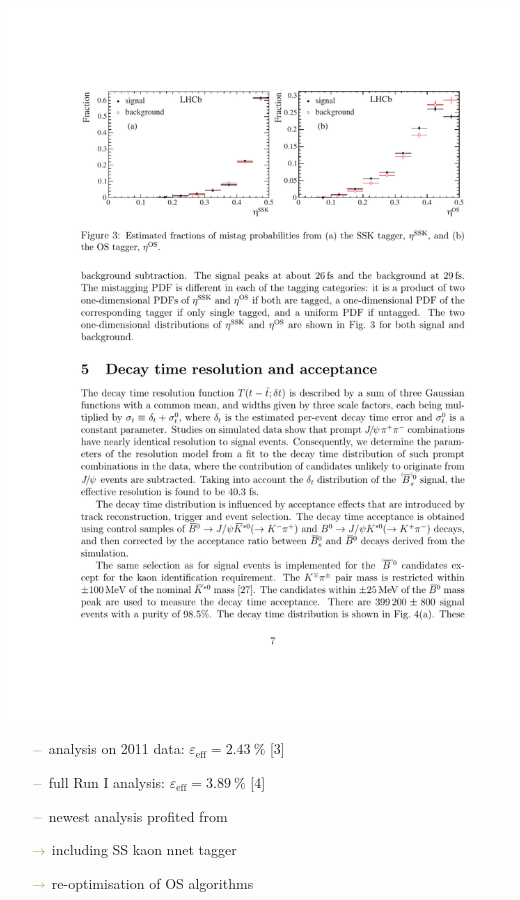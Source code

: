 {\begin{minipage}{0.474\boxwidth}
\begin{itemize}
\vspace{-1.7em}
\begin{center}
\includegraphics[width=0.315\boxwidth]{figures/Jpsipipi_SSK.pdf}
\end{center}
\vspace{-2.7em}

	\begin{itemize}
	\setlength\itemsep{0.01em}
	\setlength{\itemindent}{-.11in}
	\item[${\color{tu_gruen}-}$] analysis on \num{2011} data: $\varepsilon_\text{eff}=\SI{2.43}{\%}$ [3] 
	\item[${\color{tu_gruen}-}$] full Run I analysis: $\varepsilon_\text{eff}=\SI{3.89}{\%}$ [4] 
	\item[${\color{tu_gruen}-}$] newest analysis profited from 
	\setlength{\itemindent}{.05in}
	\item[${\color{tu_gruen}\rightarrow}$] including SS kaon nnet tagger
	\item[${\color{tu_gruen}\rightarrow}$] re-optimisation of OS algorithms
	\end{itemize}
	

\end{itemize}
\end{minipage}}
